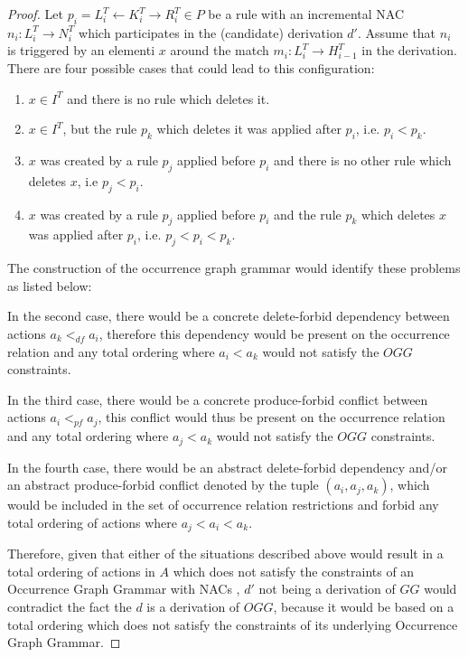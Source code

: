 \begin{proof}
  Let $p_i = L^T_i \leftarrow K^T_i \rightarrow R^T_i \in P$ be a rule with an incremental NAC $n_i : L_i^T \rightarrow N_i^T$ which participates in the (candidate) derivation $d'$.
  Assume that $n_i$ is triggered by an elementi $x$ around the match $m_i : L_i^T \rightarrow H^T_{i-1}$ in the derivation. There are four possible cases that could lead to this configuration:
\begin{enumerate}
  \item $x \in I^T$ and there is no rule which deletes it.
  \item $x \in I^T$, but the rule $p_k$ which deletes it was applied after $p_i$, i.e. $p_i < p_k$. 
  \item $x$ was created by a rule $p_j$ applied before $p_i$ and there is no other rule which deletes $x$, i.e $p_j < p_i$.
  \item $x$ was created by a rule $p_j$ applied before $p_i$ and the rule $p_k$ which deletes $x$ was applied after $p_i$, i.e. $p_j < p_i < p_k$.
\end{enumerate}

  The construction of the occurrence graph grammar would identify these problems as listed below:


  In the second case, there would be a concrete delete-forbid dependency between actions $a_k <_{df} a_i$, therefore this dependency would be present on the occurrence relation and any total ordering where $a_i < a_k$ would not satisfy the $OGG$ constraints.

  In the third case, there would be a concrete produce-forbid conflict between actions $a_i <_{pf} a_j$, this conflict would thus be present on the occurrence relation and any total ordering where $a_j < a_k$ would not satisfy the $OGG$ constraints.

  In the fourth case, there would be an abstract delete-forbid dependency and/or an abstract produce-forbid conflict denoted by the tuple $(a_i,a_j,a_k)$, which would be included in the set of occurrence relation restrictions and forbid any total ordering of actions where $a_j < a_i < a_k$.

  Therefore, given that either of the situations described above would result in a total ordering of actions in $A$ which does not satisfy the constraints of an Occurrence Graph Grammar with NACs \occurrenceGrammar{}, $d'$ not being a derivation of $GG$ would contradict the fact the $d$ is a derivation of $OGG$, because it would be based on a total ordering which does not satisfy the constraints of its underlying Occurrence Graph Grammar.

\end{proof}


